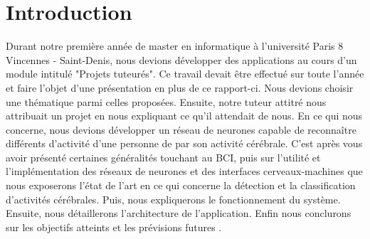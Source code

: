 \part*{Introduction}

 Durant notre première année de master en informatique à l'université Paris 8 Vincennes - Saint-Denis, nous devions développer des applications au cours d'un module intitulé "Projets tuteurés".
 Ce travail devait être effectué sur toute l'année et faire l'objet d'une présentation en plus de ce rapport-ci. Nous devions choisir une thématique parmi celles proposées.
 Ensuite, notre tuteur attitré nous attribuait un projet en nous expliquant ce qu'il attendait de nous. En ce qui nous concerne, nous devions développer un réseau de neurones capable de reconnaître différents d'activité d'une personne de par son activité cérébrale.
 C'est après vous avoir présenté certaines généralités touchant au BCI, puis sur l'utilité et l'implémentation des réseaux de neurones et des interfaces cerveaux-machines que nous exposerons l'état de l'art en ce qui concerne la détection et la classification d'activités cérébrales. Puis, nous expliquerons le fonctionnement du système. Ensuite, nous détaillerons l'architecture de l'application. Enfin nous conclurons sur les objectifs atteints et les prévisions futures .  